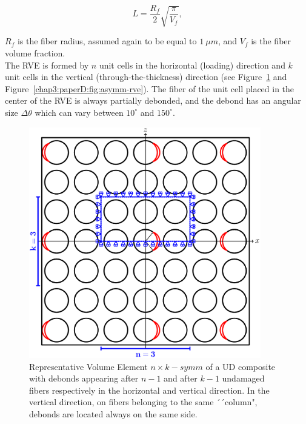 \begin{equation}\label{chap3:paperC:eq:LVf}
L=\frac{R_{f}}{2}\sqrt{\frac{\pi}{V_{f}}},
\end{equation}

$R_{f}$ is the fiber radius, assumed again to be equal to $1\ \mu m$, and $V_{f}$ is the fiber volume fraction.\\
The RVE is formed by $n$ unit cells in the horizontal (loading) direction and $k$ unit cells in the vertical (through-the-thickness) direction (see Figure~\ref{chap3:paperD:fig:coupling-rve} and Figure~\ref{chap3:paperD:fig:asymm-rve}). The fiber of the unit cell placed in the center of the RVE is always partially debonded, and the debond has an angular size $\Delta\theta$ which can vary between $10^{\circ}$ and $150^{\circ}$.

\begin{figure}[!htb]
\centering
  \includegraphics[width=0.9\textwidth]{paperD/coupling.pdf}
\caption{Representative Volume Element $n \times k-symm$ of a UD composite with debonds appearing after $n-1$ and after $k-1$ undamaged fibers respectively in the horizontal and vertical direction. In the vertical direction, on fibers belonging to the same ´´column", debonds are located always on the same side.}\label{chap3:paperD:fig:coupling-rve}
\end{figure}

